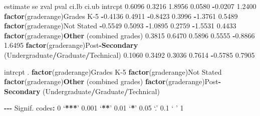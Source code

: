 \documentclass[
]{book}
\newenvironment{Shaded}{\begin{snugshade}}{\end{snugshade}}
\newcommand{\DecValTok}[1]{\textcolor[rgb]{0.00,0.00,0.81}{#1}}
\newcommand{\ErrorTok}[1]{\textcolor[rgb]{0.64,0.00,0.00}{\textbf{#1}}}
\newcommand{\FloatTok}[1]{\textcolor[rgb]{0.00,0.00,0.81}{#1}}
\newcommand{\FunctionTok}[1]{\textcolor[rgb]{0.13,0.29,0.53}{\textbf{#1}}}
\newcommand{\NormalTok}[1]{#1}
\newcommand{\SpecialCharTok}[1]{\textcolor[rgb]{0.81,0.36,0.00}{\textbf{#1}}}
\begin{document}
\begin{Shaded}
\begin{Highlighting}[]
\NormalTok{                                                                     estimate      se     zval    pval    ci.lb   ci.ub }
\NormalTok{intrcpt                                                                }\FloatTok{0.6096}  \FloatTok{0.3216}   \FloatTok{1.8956}  \FloatTok{0.0580}  \SpecialCharTok{{-}}\FloatTok{0.0207}  \FloatTok{1.2400} 
\FunctionTok{factor}\NormalTok{(graderange)Grades K}\DecValTok{{-}5}                                          \SpecialCharTok{{-}}\FloatTok{0.4136}  \FloatTok{0.4911}  \SpecialCharTok{{-}}\FloatTok{0.8423}  \FloatTok{0.3996}  \SpecialCharTok{{-}}\FloatTok{1.3761}  \FloatTok{0.5489} 
\FunctionTok{factor}\NormalTok{(graderange)Not Stated                                          }\SpecialCharTok{{-}}\FloatTok{0.5549}  \FloatTok{0.5093}  \SpecialCharTok{{-}}\FloatTok{1.0895}  \FloatTok{0.2759}  \SpecialCharTok{{-}}\FloatTok{1.5531}  \FloatTok{0.4433} 
\FunctionTok{factor}\NormalTok{(graderange)}\FunctionTok{Other}\NormalTok{ (combined grades)                              }\FloatTok{0.3815}  \FloatTok{0.6470}   \FloatTok{0.5896}  \FloatTok{0.5555}  \SpecialCharTok{{-}}\FloatTok{0.8866}  \FloatTok{1.6495} 
\FunctionTok{factor}\NormalTok{(graderange)Post}\SpecialCharTok{{-}}\FunctionTok{Secondary}\NormalTok{ (Undergraduate}\SpecialCharTok{/}\NormalTok{Graduate}\SpecialCharTok{/}\NormalTok{Technical)    }\FloatTok{0.1060}  \FloatTok{0.3492}   \FloatTok{0.3036}  \FloatTok{0.7614}  \SpecialCharTok{{-}}\FloatTok{0.5785}  \FloatTok{0.7905} 
                                                                       
\NormalTok{intrcpt                                                              . }
\FunctionTok{factor}\NormalTok{(graderange)Grades K}\DecValTok{{-}5}                                           
\FunctionTok{factor}\NormalTok{(graderange)Not Stated                                           }
\FunctionTok{factor}\NormalTok{(graderange)}\FunctionTok{Other}\NormalTok{ (combined grades)                              }
\FunctionTok{factor}\NormalTok{(graderange)Post}\SpecialCharTok{{-}}\FunctionTok{Secondary}\NormalTok{ (Undergraduate}\SpecialCharTok{/}\NormalTok{Graduate}\SpecialCharTok{/}\NormalTok{Technical)    }

\SpecialCharTok{{-}{-}{-}}
\NormalTok{Signif. codes}\SpecialCharTok{:}  \DecValTok{0}\NormalTok{ ‘}\SpecialCharTok{**}\ErrorTok{*}\NormalTok{’ }\FloatTok{0.001}\NormalTok{ ‘}\SpecialCharTok{**}\NormalTok{’ }\FloatTok{0.01}\NormalTok{ ‘}\SpecialCharTok{*}\NormalTok{’ }\FloatTok{0.05}\NormalTok{ ‘.’ }\FloatTok{0.1}\NormalTok{ ‘ ’ }\DecValTok{1}
\end{Highlighting}
\end{Shaded}
\end{document}
